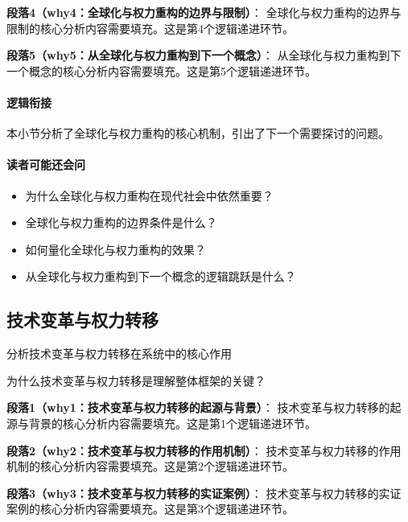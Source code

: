 \documentclass[../main.tex]{subfiles}
\begin{document}
{{\textbf{段落4（why4：全球化与权力重构的边界与限制）}：
全球化与权力重构的边界与限制的核心分析内容需要填充。这是第4个逻辑递进环节。


\textbf{段落5（why5：从全球化与权力重构到下一个概念）}：
从全球化与权力重构到下一个概念的核心分析内容需要填充。这是第5个逻辑递进环节。


\paragraph*{逻辑衔接}
本小节分析了全球化与权力重构的核心机制，引出了下一个需要探讨的问题。

\paragraph*{读者可能还会问}
\begin{itemize}
\item 为什么全球化与权力重构在现代社会中依然重要？
\item 全球化与权力重构的边界条件是什么？
\item 如何量化全球化与权力重构的效果？
\item 从全球化与权力重构到下一个概念的逻辑跳跃是什么？
\end{itemize}


\subsection{技术变革与权力转移}

\begin{motivation}
分析技术变革与权力转移在系统中的核心作用
\end{motivation}

\begin{logicmap}
[逻辑链占位]
\end{logicmap}

\begin{questionbox}
为什么技术变革与权力转移是理解整体框架的关键？
\end{questionbox}

\textbf{段落1（why1：技术变革与权力转移的起源与背景）}：
技术变革与权力转移的起源与背景的核心分析内容需要填充。这是第1个逻辑递进环节。


\textbf{段落2（why2：技术变革与权力转移的作用机制）}：
技术变革与权力转移的作用机制的核心分析内容需要填充。这是第2个逻辑递进环节。


\textbf{段落3（why3：技术变革与权力转移的实证案例）}：
技术变革与权力转移的实证案例的核心分析内容需要填充。这是第3个逻辑递进环节。


}}
\end{document}
